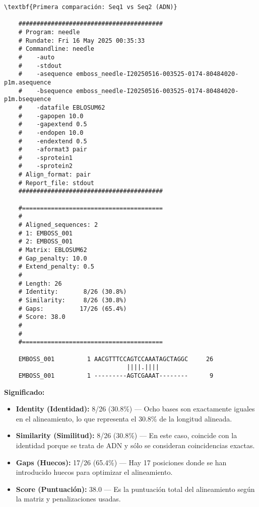 \documentclass[fleqn,10pt]{article}
\begin{document}
    \begin{lstlisting}[style=outputstyle, caption={Alineamiento local por EMBOSS Water (ejemplo)}, basicstyle=\ttfamily\footnotesize]
    \textbf{Primera comparación: Seq1 vs Seq2 (ADN)}

    ########################################
    # Program: needle
    # Rundate: Fri 16 May 2025 00:35:33
    # Commandline: needle
    #    -auto
    #    -stdout
    #    -asequence emboss_needle-I20250516-003525-0174-80484020-p1m.asequence
    #    -bsequence emboss_needle-I20250516-003525-0174-80484020-p1m.bsequence
    #    -datafile EBLOSUM62
    #    -gapopen 10.0
    #    -gapextend 0.5
    #    -endopen 10.0
    #    -endextend 0.5
    #    -aformat3 pair
    #    -sprotein1
    #    -sprotein2
    # Align_format: pair
    # Report_file: stdout
    ########################################

    #=======================================
    #
    # Aligned_sequences: 2
    # 1: EMBOSS_001
    # 2: EMBOSS_001
    # Matrix: EBLOSUM62
    # Gap_penalty: 10.0
    # Extend_penalty: 0.5
    #
    # Length: 26
    # Identity:       8/26 (30.8%)
    # Similarity:     8/26 (30.8%)
    # Gaps:          17/26 (65.4%)
    # Score: 38.0
    # 
    #
    #=======================================

    EMBOSS_001         1 AACGTTTCCAGTCCAAATAGCTAGGC     26
                                  ||||.||||        
    EMBOSS_001         1 ---------AGTCGAAAT--------      9

    \end{lstlisting}
    \textbf{Significado:}  
    \begin{itemize}
        \item \textbf{Identity (Identidad):} 8/26 (30.8\%) --- Ocho bases son exactamente iguales en el alineamiento, lo que representa el 30.8\% de la longitud alineada.
        \item \textbf{Similarity (Similitud):} 8/26 (30.8\%) --- En este caso, coincide con la identidad porque se trata de ADN y sólo se consideran coincidencias exactas.
        \item \textbf{Gaps (Huecos):} 17/26 (65.4\%) --- Hay 17 posiciones donde se han introducido huecos para optimizar el alineamiento.
        \item \textbf{Score (Puntuación):} 38.0 --- Es la puntuación total del alineamiento según la matriz y penalizaciones usadas.
    \end{itemize}
\end{document}
